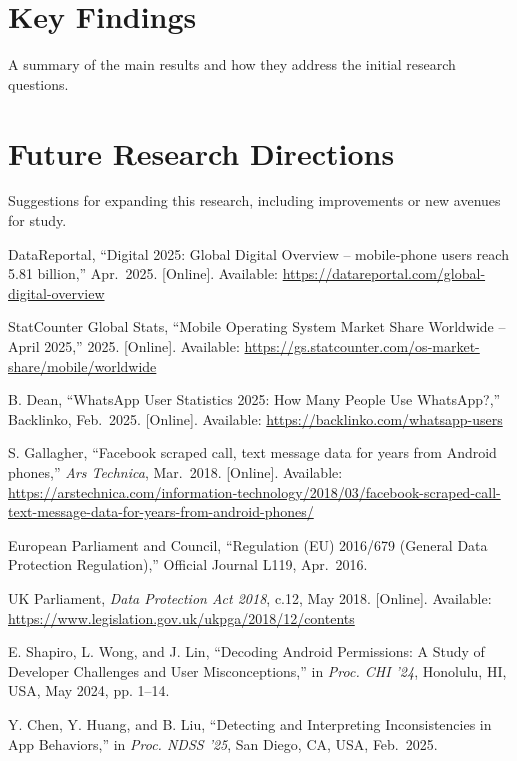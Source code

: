 \documentclass[a4paper,12pt]{report}
\begin{document}
\section{Key Findings}
A summary of the main results and how they address the initial research questions.

\section{Future Research Directions}
Suggestions for expanding this research, including improvements or new avenues for study.

\begin{thebibliography}{99}
DataReportal, “Digital 2025: Global Digital Overview – mobile‐phone users reach 5.81 billion,” Apr.\ 2025.  [Online]. Available: \url{https://datareportal.com/global-digital-overview}

StatCounter Global Stats, “Mobile Operating System Market Share Worldwide – April 2025,” 2025. [Online]. Available: \url{https://gs.statcounter.com/os-market-share/mobile/worldwide}

B. Dean, “WhatsApp User Statistics 2025: How Many People Use WhatsApp?,” Backlinko, Feb.\ 2025.  [Online]. Available: \url{https://backlinko.com/whatsapp-users}

S. Gallagher, “Facebook scraped call, text message data for years from Android phones,” \emph{Ars Technica}, Mar.\ 2018.  [Online]. Available: \url{https://arstechnica.com/information-technology/2018/03/facebook-scraped-call-text-message-data-for-years-from-android-phones/}

European Parliament and Council, “Regulation (EU) 2016/679 (General Data Protection Regulation),” Official Journal L119, Apr.\ 2016.

UK Parliament, \emph{Data Protection Act 2018}, c.12, May 2018.  [Online]. Available: \url{https://www.legislation.gov.uk/ukpga/2018/12/contents}

E. Shapiro, L. Wong, and J. Lin, “Decoding Android Permissions: A Study of Developer Challenges and User Misconceptions,” in \emph{Proc. CHI ’24}, Honolulu, HI, USA, May 2024, pp. 1–14.

Y. Chen, Y. Huang, and B. Liu, “Detecting and Interpreting Inconsistencies in App Behaviors,” in \emph{Proc. NDSS ’25}, San Diego, CA, USA, Feb.\ 2025.


\end{thebibliography}
\end{document}
